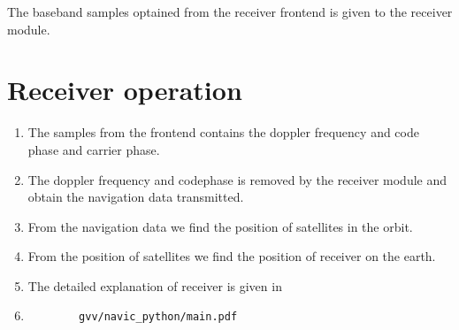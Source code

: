 The baseband samples optained from the receiver frontend is given to the receiver module.

\section{Receiver operation}

\begin{enumerate}
	\item The samples from the frontend contains the doppler frequency and code phase and carrier phase. 
	\item The doppler frequency and codephase is removed by the receiver module and obtain the navigation data transmitted.
	\item From the navigation data we find the position of satellites in the orbit.
	\item From the position of satellites we find the position of receiver on the earth.
	\item The detailed explanation of receiver is given in 
	\item[] \begin{lstlisting}
		gvv/navic_python/main.pdf
	\end{lstlisting} 
\end{enumerate}
